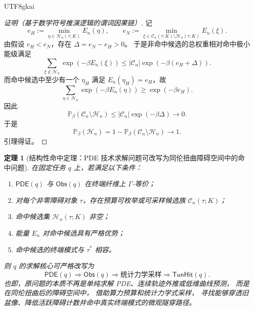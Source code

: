 \documentclass[12pt]{article}
\newtheorem{theorem}{定理}[section]
\begin{document}
\begin{CJK*}{UTF8}{gkai}
\begin{proof}[证明（基于数学符号推演逻辑的谓词因果链）]
记
\[
  e_H:=\min_{\eta\in\mathcal H_n(\tau;K)}E_n(\eta),
  \qquad
  e_N:=\min_{\xi\in\mathcal C_n(\tau;K)\setminus\mathcal H_n(\tau;K)}E_n(\xi).
\]
由假设 \(e_H<e_N\)，存在 \(\Delta=e_N-e_H>0\)。
于是非命中候选的总权重相对命中极小能级满足
\[
  \sum_{\xi\notin\mathcal H_n}
  \exp(-\beta E_n(\xi))
  \le
  |\mathcal C_n|\exp(-\beta(e_H+\Delta)).
\]
而命中候选中至少有一个 \(\eta_H\) 满足 \(E_n(\eta_H)=e_H\)，故
\[
  \sum_{\eta\in\mathcal H_n}
  \exp(-\beta E_n(\eta))
  \ge
  \exp(-\beta e_H).
\]
因此
\[
  \mathbb P_\beta(\mathcal C_n\setminus\mathcal H_n)
  \le
  |\mathcal C_n|\exp(-\beta\Delta)
  \longrightarrow 0.
\]
于是
\[
  \mathbb P_\beta(\mathcal H_n)
  =
  1-\mathbb P_\beta(\mathcal C_n\setminus\mathcal H_n)
  \longrightarrow 1.
\]
引理得证。
\end{proof}

\begin{theorem}[结构性命中定理：PDE 技术求解问题可改写为同伦扭曲障碍空间中的命中问题]
\label{thm:tex1-ch5-structural-hit}
在固定任务 \(q\) 上，若满足以下条件：
\begin{enumerate}
  \item \(\mathsf{PDE}(q)\) 与 \(\mathsf{Obs}(q)\) 在终端纤维上 \(\Gamma\)-等价；
  \item 对每个非零障碍对象 \(\tau\)，存在预算可枚举或可采样候选族 \(\mathcal C_n(\tau;K)\)；
  \item 命中候选集 \(\mathcal H_n(\tau;K)\) 非空；
  \item 能量 \(E_n\) 对命中候选具有严格优势；
  \item 命中候选的终端模式与 \(\tau^\ast\) 相容。
\end{enumerate}
则 \(q\) 的求解核心可严格改写为
\[
  \mathsf{PDE}(q)
  \Longrightarrow
  \mathsf{Obs}(q)
  \Longrightarrow
  \text{统计力学采样}
  \Longrightarrow
  \mathsf{TunHit}(q).
\]
也即，原问题的本质不再是单纯求解 PDE、连续轨迹外推或低维曲线预测，
而是在同伦扭曲后的障碍空间中，
借助算力预算和统计力学式采样，
寻找能够穿透旧盆像、降低活跃障碍计数并命中真实终端模式的微观隧穿路径。
\end{theorem}


\end{CJK*}
\end{document}
